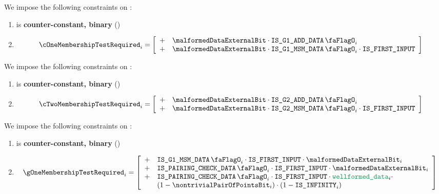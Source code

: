We impose the following constraints on \cOneMembershipTestRequired{}:
\begin{enumerate}
    \item \cOneMembershipTestRequired{} is \textbf{counter-constant, binary} \quad (\trash)
    \item
        \[  
        \cOneMembershipTestRequired_{i} = 
        \left[ \begin{array}{clcr}
            + & \malformedDataExternalBit \cdot \isBlsGOneAddData_{i} \\
            + & \malformedDataExternalBit \cdot \isBlsGOneMsmData_{i} \cdot \isFirstInput \\
        \end{array} \right] \vspace{2mm}  
        \]
\end{enumerate}
We impose the following constraints on \cTwoMembershipTestRequired{}:
\begin{enumerate}
    \item \cTwoMembershipTestRequired{} is \textbf{counter-constant, binary} \quad (\trash)
    \item 
        \[  
        \cTwoMembershipTestRequired_{i} = 
        \left[ \begin{array}{clcr}
            + & \malformedDataExternalBit \cdot \isBlsGTwoAddData_{i} \\
            + & \malformedDataExternalBit \cdot \isBlsGTwoMsmData_{i} \cdot \isFirstInput \\
        \end{array} \right] \vspace{2mm}  
        \]
\end{enumerate}
We impose the following constraints on \gOneMembershipTestRequired{}:
\begin{enumerate}
    \item \gOneMembershipTestRequired{} is \textbf{counter-constant, binary} \quad (\trash)
    \item 
        \[
            \gOneMembershipTestRequired_{i} = 
            \left[ \begin{array}{cl} 
                + & \isBlsGOneMsmData_{i} \cdot \isFirstInput \cdot \malformedDataExternalBit_{i}  \\
                + & \isBlsPairingCheckData_{i} \cdot \isFirstInput \cdot \malformedDataExternalBit_{i} \\
                + & \isBlsPairingCheckData_{i} \cdot \isFirstInput \cdot \locWellformedData_{i} \cdot \\
                & (1 - \nontrivialPairOfPointsBit_{i}) \cdot (1 - \isInfinity_{i}) \\
            \end{array} \right] \\
        \]
\end{enumerate}
